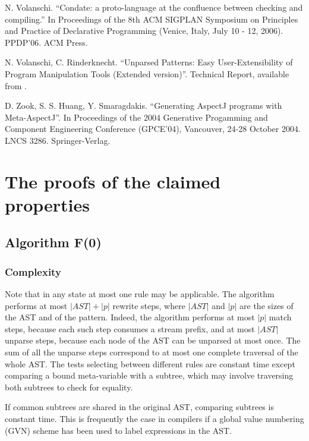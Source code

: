 \documentclass{sigplanconf}
\begin{document}
\begin{thebibliography}{10}

 N. Volanschi. ``Condate: a proto-language at the
confluence between checking and compiling.'' In Proceedings of the 8th
ACM SIGPLAN Symposium on Principles and Practice of Declarative
Programming (Venice, Italy, July 10 - 12, 2006). PPDP'06. ACM Press.

 N. Volanschi, C. Rinderknecht. ``Unparsed Patterns:
Easy User-Extensibility of Program Manipulation Tools (Extended
version)''. Technical Report, available from \cite{matchbox}.

 D. Zook, S. S. Huang, Y. Smaragdakis. ``Generating
AspectJ programs with Meta-AspectJ''. In Proceedings of the 2004
Generative Progamming and Component Engineering Conference (GPCE'04),
Vancouver, 24-28 October 2004. LNCS 3286. Springer-Verlag.

\end{thebibliography}

\appendix
\section{The proofs of the claimed properties}

\subsection{Algorithm F(0)}
\subsubsection{Complexity}
Note that in any state at most one rule may be applicable. The
algorithm performs at most $|AST|+|p|$ rewrite steps, where $|AST|$
and $|p|$ are the sizes of the AST and of the pattern. Indeed, the
algorithm performs at most $|p|$ match steps, because each such step
consumes a stream prefix, and at most $|AST|$ unparse steps, because
each node of the AST can be unparsed at most once. The sum of all the
unparse steps correspond to at most one complete traversal of the
whole AST. The tests selecting between different rules are constant
time except comparing a bound meta-variable with a subtree, which may
involve traversing both subtrees to check for equality.

If common subtrees are shared in the original AST, comparing subtrees
is constant time. This is frequently the case in compilers if a global
value numbering (GVN) scheme \cite{gvn} has been used to label
expressions in the AST.
\end{document}
